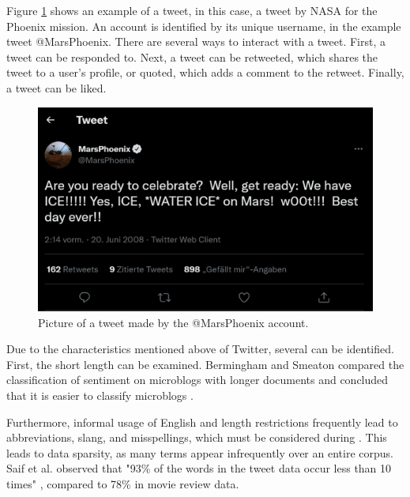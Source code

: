 Figure \ref{fig:example_tweet} shows an example of a tweet, in this case, a tweet by NASA for the Phoenix mission. An account is identified by its unique username, in the example tweet @MarsPhoenix. There are several ways to interact with a tweet. First, a tweet can be responded to. Next, a tweet can be retweeted, which shares the tweet to a user's profile, or quoted, which adds a comment to the retweet. Finally, a tweet can be liked.

\begin{figure}
    \centering
    \includegraphics[scale=0.3]{Images/twitter_image.png}
    \caption{Picture of a tweet made by the @MarsPhoenix account. }
    \label{fig:example_tweet}
\end{figure}

Due to the characteristics mentioned above of Twitter, several  can be identified.
First, the short length can be examined. Bermingham and Smeaton compared the classification of sentiment on microblogs with longer documents and concluded that it is easier to classify microblogs \cite{microblogs}.

Furthermore, informal usage of English and length restrictions frequently lead to abbreviations, slang, and misspellings, which must be considered during . This leads to data sparsity, as many terms appear infrequently over an entire corpus. Saif et al. observed that "93\% of the words in the tweet data occur less than 10 times" \cite[p.~3]{data_sparsity}, compared to 78\% in movie review data.


